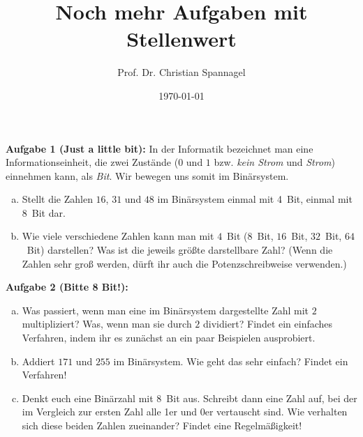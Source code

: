 \documentclass{../cssheet}
\title{Noch mehr Aufgaben mit Stellenwert}
\author{Prof. Dr. Christian Spannagel}
\date{\today}
\begin{document}
\printtitle


\textbf{Aufgabe 1 (Just a little bit):}  In der Informatik bezeichnet man eine Informationseinheit, die zwei Zustände ($0$ und $1$ bzw. \emph{kein Strom} und \emph{Strom}) einnehmen kann, als \emph{Bit}. Wir bewegen uns somit im Binärsystem. 
\begin{enumerate}[a)]
\item Stellt die Zahlen $16$, $31$ und $48$ im Binärsystem einmal mit 4~Bit, einmal mit 8~Bit dar. 
\item Wie viele verschiedene Zahlen kann man mit $4$~Bit ($8$~Bit, $16$~Bit, $32$~Bit, $64$~Bit) darstellen? Was ist die jeweils größte darstellbare Zahl?  (Wenn die Zahlen sehr groß werden, dürft ihr auch die Potenzschreibweise verwenden.)
\end{enumerate}

\textbf{Aufgabe 2 (Bitte 8 Bit!):} 
\begin{enumerate}[a)]
\item Was passiert, wenn man eine im Binärsystem dargestellte Zahl mit $2$ multipliziert? Was, wenn man sie durch $2$ dividiert? Findet ein einfaches Verfahren, indem ihr es zunächst an ein paar Beispielen ausprobiert.
\item Addiert $171$ und $255$ im Binärsystem. Wie geht das sehr einfach? Findet ein Verfahren!
\item Denkt euch eine Binärzahl mit 8~Bit aus. Schreibt dann eine Zahl auf, bei der im Vergleich zur ersten Zahl alle 1er und 0er vertauscht sind. Wie verhalten sich diese beiden Zahlen zueinander? Findet eine Regelmäßigkeit!
\end{enumerate}


\vspace*{10mm}
\printlicense

\printsocials
\end{document}

